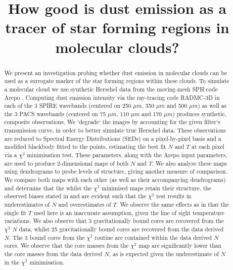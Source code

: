 \documentclass{report}
\title{\vspace{-15mm}\fontsize{24pt}{10pt}\selectfont\textbf{How good is dust emission as a tracer of star forming regions in molecular clouds?}} %
\author{
\large
\textsc{\parbox{\linewidth}{\centering%
Tomas James\endgraf\skip
Student ID: 1158976\endgraf\bigskip}} %
\vspace{-5mm}
}
\date{\large\parbox{\linewidth}{\centering%
  Supervisor: Dr. P. C. Clark \endgraf\bigskip\today}}
\begin{document}
\maketitle %

\thispagestyle{fancy} %


\begin{abstract}
We present an investigation probing whether dust emission in molecular clouds can be used as a surrogate marker of the star forming regions within these clouds. To simulate a molecular cloud we use synthetic Herschel data from the moving-mesh SPH code Arepo \parencite{arepo}. Computing dust emission intensity via the ray-tracing code RADMC-3D \parencite{RADMC-3D} in each of the 3 SPIRE \parencite{SPIRE} wavebands (centered on 250 $\mu m$, 350 $\mu m$ and 500 $\mu m$) as well as the 3 PACS \parencite{PACS} wavebands (centered on 75 $\mu m$, 110 $\mu m$ and 170 $\mu m$) produces synthetic, composite observations. We `degrade` the images by accounting for the given filter`s transmission curve, in order to better simulate true Herschel data.  These observations are reduced to Spectral Energy Distributions (SEDs) on a pixel-by-pixel basis and a modified blackbody fitted to the points, estimating the best fit $N$ and $T$ at each pixel via a $\chi^{2}$ minimisation test. These parameters, along with the Arepo input parameters, are used to produce 2-dimensional maps of both $N$ and $T$. We also analyse these maps using dendrograms to probe levels of structure, giving another measure of comparison. We compare both maps with each other (as well as their accompanying dendrograms) and determine that the whilst the $\chi^{2}$ minimised maps retain their structure, the observed biases stated in \textcite{noise, noiseb} and \textcite{kelly} are evident such that the $\chi^{2}$ test results in underestimates of $N$ and overestimates of $T$. We observe the same effects as \textcite{noise} in that the single fit $T$ used here is an inaccurate assumption, given the line of sight temperature variations. We also observe that 3 gravitationally bound cores are recovered from the $\chi^{2}$ $N$ data, whilst 25 gravitationally bound cores are recovered from the data derived $N$. The 3 bound cores from the $\chi^{2}$ routine are contained within the data derived $N$ cores. We observe that the core masses from the $\chi^{2}$ map are significantly lower than the core masses from the data derived $N$, as is expected given the underestimate of $N$ in the $\chi^{2}$ minimisation.
\end{abstract}
\end{document}
